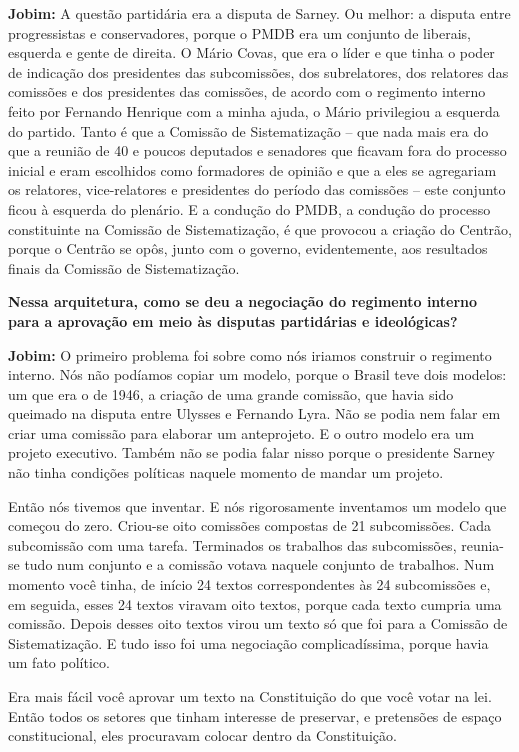 \textbf{Jobim:} A questão partidária era a disputa de Sarney. Ou melhor:
a disputa entre progressistas e conservadores, porque o PMDB era um
conjunto de liberais, esquerda e gente de direita. O Mário Covas, que
era o líder e que tinha o poder de indicação dos presidentes das
subcomissões, dos subrelatores, dos relatores das comissões e dos
presidentes das comissões, de acordo com o regimento interno feito por
Fernando Henrique com a minha ajuda, o Mário privilegiou a esquerda do
partido. Tanto é que a Comissão de Sistematização -- que nada mais era
do que a reunião de 40 e poucos deputados e senadores que ficavam fora
do processo inicial e eram escolhidos como formadores de opinião e que a
eles se agregariam os relatores, vice-relatores e presidentes do período
das comissões -- este conjunto ficou à esquerda do plenário. E a
condução do PMDB, a condução do processo constituinte na Comissão de
Sistematização, é que provocou a criação do Centrão, porque o Centrão se
opôs, junto com o governo, evidentemente, aos resultados finais da
Comissão de Sistematização.

\textbf{Nessa arquitetura, como se deu a negociação do regimento interno
para a aprovação em meio às disputas partidárias e ideológicas?}

\textbf{Jobim:} O primeiro problema foi sobre como nós iriamos construir
o regimento interno. Nós não podíamos copiar um modelo, porque o Brasil
teve dois modelos: um que era o de 1946, a criação de uma grande
comissão, que havia sido queimado na disputa entre Ulysses e Fernando
Lyra. Não se podia nem falar em criar uma comissão para elaborar um
anteprojeto. E o outro modelo era um projeto executivo. Também não se
podia falar nisso porque o presidente Sarney não tinha condições
políticas naquele momento de mandar um projeto.

Então nós tivemos que inventar. E nós rigorosamente inventamos um modelo
que começou do zero. Criou-se oito comissões compostas de 21
subcomissões. Cada subcomissão com uma tarefa. Terminados os trabalhos
das subcomissões, reunia-se tudo num conjunto e a comissão votava
naquele conjunto de trabalhos. Num momento você tinha, de início 24
textos correspondentes às 24 subcomissões e, em seguida, esses 24 textos
viravam oito textos, porque cada texto cumpria uma comissão. Depois
desses oito textos virou um texto só que foi para a Comissão de
Sistematização. E tudo isso foi uma negociação complicadíssima, porque
havia um fato político.

Era mais fácil você aprovar um texto na Constituição do que você votar
na lei. Então todos os setores que tinham interesse de preservar, e
pretensões de espaço constitucional, eles procuravam colocar dentro da
Constituição.

